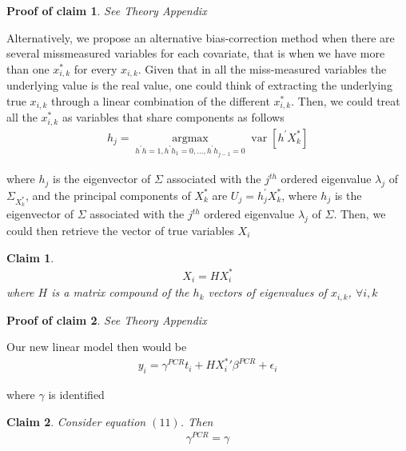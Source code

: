 \documentclass[10pt]{article}
\newtheorem{claim}{Claim}
\newtheorem{claimproof}{Proof of claim}[claim]
\begin{document}
\begin{claimproof}
See Theory Appendix
\end{claimproof}
        
        Alternatively, we propose an alternative bias-correction method when there are several missmeasured variables for each covariate, that is when we have more than one $x_{i,k}^*$ for every $x_{i,k}$. Given that in all the miss-measured variables the underlying value is the real value, one could think of extracting the underlying true $x_{i,k}$ through a linear combination of the different $x_{i,k}^*$. Then, we could treat all the $x_{i,k}^*$ as variables that share components as follows
        \begin{align}
           h_{j}=\underset{h^{\prime} h=1, h^{\prime} h_{1}=0, \ldots, h^{\prime} h_{j-1}=0}{\operatorname{argmax}} \operatorname{var}\left[h^{\prime} X^*_k\right]  
        \end{align}
        
        
        where $h_j$ is the eigenvector of $\Sigma$ associated with the $j^{t h}$ ordered eigenvalue $\lambda_{j}$ of $\Sigma_{X^*_k}$, and the principal components of $X^*_k$ are $U_{j}=h_{j}^{\prime} X^*_k$, where $h_{j}$ is the eigenvector of $\Sigma$ associated with the $j^{t h}$ ordered eigenvalue $\lambda_{j}$ of $\Sigma$. Then, we could then retrieve the vector of true variables $X_i$
\begin{claim}
\begin{align}
            X_i=HX^*_i
        \end{align}
where $H$ is a matrix compound of the $h_k$ vectors of eigenvalues of $x_{i,k}$, $\forall i,k$
\end{claim}

\begin{claimproof}
See Theory Appendix
\end{claimproof}
 
        
        Our new linear model then would be
        \begin{align}
            y_i = \gamma^{PCR} t_i + H{X^*_i}'\beta^{PCR} + \epsilon_i
        \end{align}
        
        where $\gamma$ is identified
\begin{claim}
Consider equation $(11)$. Then
\begin{align}
{\gamma}^{PCR} = \gamma
\end{align}
\end{claim}
\end{document}
